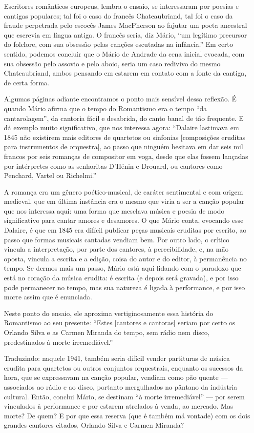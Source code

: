 Escritores românticos europeus, lembra o ensaio, se interessaram por
poesias e cantigas populares; tal foi o caso do francês Chateaubriand,
tal foi o caso da fraude perpetrada pelo escocês James MacPherson ao
fajutar um poeta ancestral que escrevia em língua antiga. O francês
seria, diz Mário, ``um legítimo precursor do folclore, com sua obsessão
pelas canções escutadas na infância.'' Em certo sentido, podemos
concluir que o Mário de Andrade da cena inicial evocada, com sua
obsessão pelo assovio e pelo aboio, seria um caso redivivo do mesmo
Chateaubriand, ambos pensando em estarem em contato com a fonte da
cantiga, de certa forma.

Algumas páginas adiante encontramos o ponto mais sensível dessa
reflexão. É quando Mário afirma que o tempo do Romantismo era o tempo
``da cantarolagem'', da cantoria fácil e desabrida, do canto banal de
tão frequente. E dá exemplo muito significativo, que nos interessa
agora: ``Dalaire lastimava em 1845 não existirem mais editores de
quartetos ou sinfonias {[}composições eruditas para instrumentos de
orquestra{]}, ao passo que ninguém hesitava em dar seis mil francos por
seis romanças de compositor em voga, desde que elas fossem lançadas por
intérpretes como as senhoritas D'Hénin e Drouard, ou cantores como
Penchard, Vartel ou Richelmi.''

A romança era um gênero poético-musical, de caráter sentimental e com
origem medieval, que em última instância era o mesmo que viria a ser a
canção popular que nos interessa aqui: uma forma que mesclava música e
poesia de modo significativo para cantar amores e desamores. O que Mário
conta, evocando esse Dalaire, é que em 1845 era difícil publicar peças
musicais eruditas por escrito, ao passo que formas musicais cantadas
vendiam bem. Por outro lado, o crítico vincula a interpretação, por
parte dos cantores, à perecibilidade, e, na mão oposta, vincula a
escrita e a edição, coisa do autor e do editor, à permanência no tempo.
Se dermos mais um passo, Mário está aqui lidando com o paradoxo que está
no coração da música erudita: é escrita (e depois será gravada), e por
isso pode permanecer no tempo, mas sua natureza é ligada à performance,
e por isso morre assim que é enunciada.

Neste ponto do ensaio, ele aproxima vertiginosamente essa história do
Romantismo ao seu presente: ``Estes {[}cantores e cantoras{]} seriam por
certo os Orlando Silva e as Carmen Miranda do tempo, sem rádio nem
disco, predestinados à morte irremediável.''

Traduzindo: naquele 1941, também seria difícil vender partituras de
música erudita para quartetos ou outros conjuntos orquestrais, enquanto
os sucessos da hora, que se expressavam na canção popular, vendiam como
pão quente --- associados ao rádio e ao disco, portanto mergulhados no
pântano da indústria cultural. Então, conclui Mário, se destinam ``à
morte irremediável'' --- por serem vinculados à performance e por estarem
atrelados à venda, ao mercado. Mas morte? De quem? E por que essa
reserva (que é também má vontade) com os dois grandes cantores citados,
Orlando Silva e Carmen Miranda?

